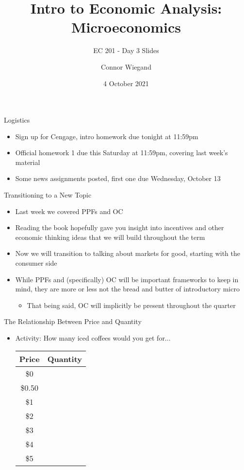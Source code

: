 \documentclass[10pt,xcolor={svgnames}]{beamer}
\title[Connor Wiegand]{Intro to Economic Analysis: Microeconomics}
\subtitle{EC 201 - Day 3 Slides}
\author[EC 201]{Connor Wiegand}
\institute[]{Department of Economics - University of Oregon}
\date{4 October 2021}
\begin{document}
\frame{\titlepage}

\begin{frame}{Logistics}
    \begin{itemize}[<+->]
        \item Sign up for Cengage, intro homework due tonight at 11:59pm
        \item Official homework 1 due this Saturday at 11:59pm, covering last week's material
        \item Some news assignments posted, first one due Wednesday, October 13
    \end{itemize}
\end{frame}

\begin{frame}{Transitioning to a New Topic}
    \begin{itemize}[<+->]
        \item Last week we covered PPFs and OC
        \item Reading the book hopefully gave you insight into incentives and other economic thinking ideas that we will build throughout the term
        \item Now we will transition to talking about markets for good, starting with the consumer side
        \item While PPFs and (specifically) OC will be important frameworks to keep in mind, they are more or less not the bread and butter of introductory micro
        \begin{itemize}
            \item <4-> That being said, OC will implicitly be present throughout the quarter
        \end{itemize}
    \end{itemize}
\end{frame}

\begin{frame}{The Relationship Between Price and Quantity}
    \begin{itemize}
        \item Activity: How many iced coffees would you get for...
        \begin{table}[H]
            \centering
            \begin{tabular}{c|c}
                Price & Quantity \\
                \hline
                \$0 &\pause 18\\
                \$0.50 &\pause 10\\
                \$1 &\pause 8\\
                \$2 &\pause 4\\
                \$3 &\pause 2\\
                \$4 &\pause 1\\
                \$5 &\pause 0
            \end{tabular}
        \end{table}
    \end{itemize}
\end{frame}
\end{document}
